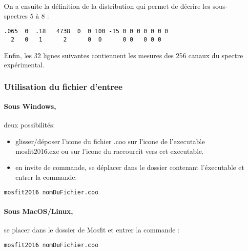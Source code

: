 On a ensuite la définition de la distribution qui permet de décrire les sous-spectres 5 à 8 :
\begin{lstlisting}[frame=single]
.065  0  .18   4738  0  0 100 -15 0 0 0 0 0 0 0
  2   0   1      2      0  0      0 0   0 0 0
\end{lstlisting}
Enfin, les 32 lignes suivantes contiennent les mesures des 256 canaux du spectre expérimental.
\FloatBarrier


\subsubsection{Utilisation du fichier d'entree}
\paragraph{Sous Windows,} deux possibilités:
\begin{itemize}
\item glisser/déposer l'icone du fichier .coo sur l'icone de l'executable mosfit2016.exe ou sur l'icone du raccourcit vers cet executable, 
\item en invite de commande, se déplacer dans le dossier contenant l'éxecutable et entrer la commande: 
\end{itemize}

\begin{lstlisting}[frame=single]
mosfit2016 nomDuFichier.coo
\end{lstlisting}

\paragraph{Sous MacOS/Linux, } se placer dans le dossier de Mosfit et entrer la commande : 

\begin{lstlisting}[frame=single]
mosfit2016 nomDuFichier.coo
\end{lstlisting}
\FloatBarrier
